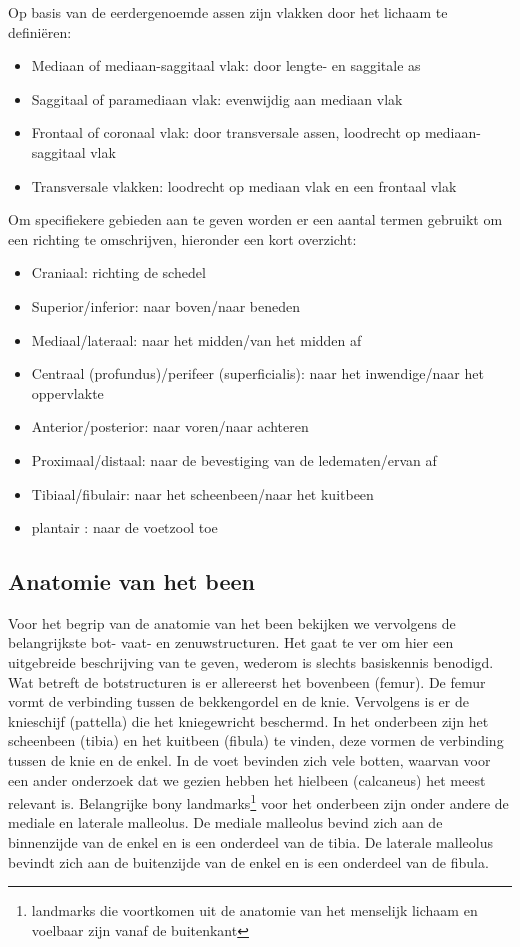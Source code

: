 Op basis van de eerdergenoemde assen zijn vlakken door het lichaam te defini\"{e}ren:
\begin{itemize}
	\item Mediaan of mediaan-saggitaal vlak: door lengte- en saggitale as
	\item Saggitaal of paramediaan vlak: evenwijdig aan mediaan vlak
	\item Frontaal of coronaal vlak: door transversale assen, loodrecht op mediaan-saggitaal vlak
	\item Transversale vlakken: loodrecht op mediaan vlak en een frontaal vlak
\end{itemize}

Om specifiekere gebieden aan te geven worden er een aantal termen gebruikt om een richting te omschrijven, hieronder een kort overzicht:
\begin{itemize}
	\item Craniaal: richting de schedel
	\item Superior/inferior: naar boven/naar beneden
	\item Mediaal/lateraal: naar het midden/van het midden af
	\item Centraal (profundus)/perifeer (superficialis): naar het inwendige/naar het oppervlakte
	\item Anterior/posterior: naar voren/naar achteren
	\item Proximaal/distaal: naar de bevestiging van de ledematen/ervan af
	\item Tibiaal/fibulair: naar het scheenbeen/naar het kuitbeen
	\item plantair : naar de voetzool toe
\end{itemize}

\subsection{Anatomie van het been}

Voor het begrip van de anatomie van het been bekijken we vervolgens de belangrijkste bot- vaat- en zenuwstructuren. 
Het gaat te ver om hier een uitgebreide beschrijving van te geven, wederom is slechts basiskennis benodigd. Wat betreft de botstructuren is er allereerst het bovenbeen (femur). De femur vormt de verbinding tussen de bekkengordel en de knie. Vervolgens is er de knieschijf (pattella) die het kniegewricht beschermd. In het onderbeen zijn het scheenbeen (tibia) en het kuitbeen (fibula) te vinden, deze vormen de verbinding tussen de knie en de enkel. In de voet bevinden zich vele botten, waarvan voor een ander onderzoek dat we gezien hebben het hielbeen (calcaneus) het meest relevant is. Belangrijke bony landmarks\footnote{landmarks die voortkomen uit de anatomie van het menselijk lichaam en voelbaar zijn vanaf de buitenkant} voor het onderbeen zijn onder andere de mediale en laterale malleolus. De mediale malleolus bevind zich aan de binnenzijde van de enkel en is een onderdeel van de tibia. De laterale malleolus bevindt zich aan de buitenzijde van de enkel en is een onderdeel van de fibula.

